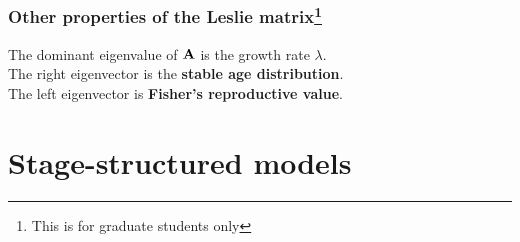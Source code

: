 \documentclass[color=usenames,dvipsnames]{beamer}\usepackage[]{graphicx}\usepackage[]{color}
\begin{document}









\begin{frame}
  \frametitle{Other properties of the Leslie matrix\footnote{This is
      for graduate students only}}
  \Large
  The dominant eigenvalue of ${\bf A}$ is the growth rate $\lambda$. \\
  \pause
  \vfill
  The right eigenvector is the {\bf stable age distribution}. \\
  \pause
  \vfill
  The left eigenvector is {\bf Fisher's reproductive value}. \\
\end{frame}





\section{Stage-structured models}
\end{document}

